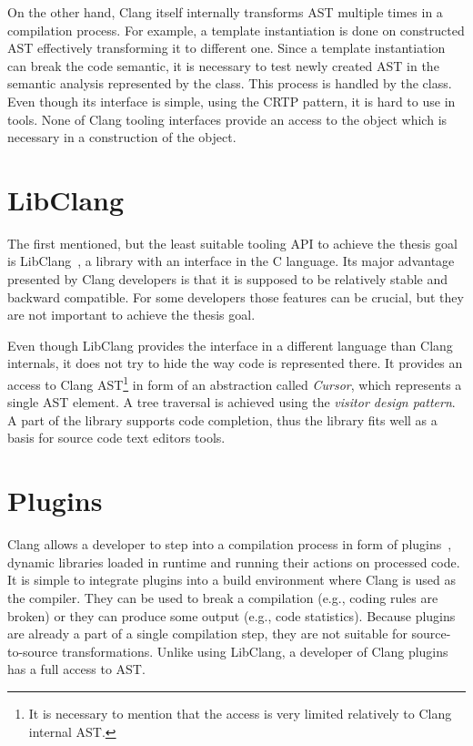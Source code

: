 On the other hand, Clang itself internally transforms AST multiple times in a compilation process. For example, a template instantiation is done on constructed AST effectively transforming it to different one. Since a template instantiation can break the code semantic, it is necessary to test newly created AST in the semantic analysis represented by the  class. This process is handled by the  class. Even though its interface is simple, using the CRTP pattern, it is hard to use  in tools. None of Clang tooling interfaces provide an access to the  object which is necessary in a construction of the  object.

\section{LibClang}
The first mentioned, but the least suitable tooling API to achieve the thesis goal is LibClang~\cite{clang-libclang}, a library with an interface in the C language. Its major advantage presented by Clang developers is that it is supposed to be relatively stable and backward compatible. For some developers those features can be crucial, but they are not important to achieve the thesis goal.

Even though LibClang provides the interface in a different language than Clang internals, it does not try to hide the way code is represented there. It provides an access to Clang AST\footnote{It is necessary to mention that the access is very limited relatively to Clang internal AST.} in form of an abstraction called \emph{Cursor}, which represents a single AST element. A tree traversal is achieved using the \emph{visitor design pattern}. A part of the library supports code completion, thus the library fits well as a basis for source code text editors tools.

\section{Plugins}
Clang allows a developer to step into a compilation process in form of plugins~\cite{clang-plugins}, dynamic libraries loaded in runtime and running their actions on processed code. It is simple to integrate plugins into a build environment where Clang is used as the compiler. They can be used to break a compilation (e.g., coding rules are broken) or they can produce some output (e.g., code statistics). Because plugins are already a part of a single compilation step, they are not suitable for source-to-source transformations. Unlike using LibClang, a developer of Clang plugins has a full access to AST.

